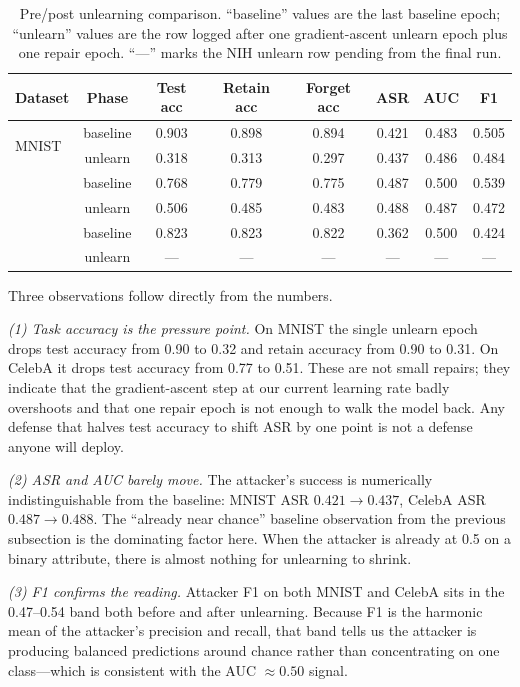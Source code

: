 \documentclass[letterpaper,twocolumn,10pt]{article}
\begin{document}
\begin{table}[t]
\centering
\small
\caption{Pre/post unlearning comparison. ``baseline'' values are the last
baseline epoch; ``unlearn'' values are the row logged after one
gradient-ascent unlearn epoch plus one repair epoch. ``---'' marks the
NIH unlearn row pending from the final run.}
\label{tab:delta}
\begin{tabular}{@{}lccccccc@{}}
\toprule
Dataset & Phase & Test acc & Retain acc & Forget acc & ASR & AUC & F1 \\
\midrule
\multirow{2}{*}{MNIST}
    & baseline & 0.903 & 0.898 & 0.894 & 0.421 & 0.483 & 0.505 \\
    & unlearn  & 0.318 & 0.313 & 0.297 & 0.437 & 0.486 & 0.484 \\
\addlinespace[2pt]
\multirow{2}{*}{CelebA}
    & baseline & 0.768 & 0.779 & 0.775 & 0.487 & 0.500 & 0.539 \\
    & unlearn  & 0.506 & 0.485 & 0.483 & 0.488 & 0.487 & 0.472 \\
\addlinespace[2pt]
\multirow{2}{*}{NIH Chest X-ray14}
    & baseline & 0.823 & 0.823 & 0.822 & 0.362 & 0.500 & 0.424 \\
    & unlearn  & ---   & ---   & ---   & ---   & ---   & ---   \\
\bottomrule
\end{tabular}
\end{table}

Three observations follow directly from the numbers.

\emph{(1) Task accuracy is the pressure point.} On MNIST the single
unlearn epoch drops test accuracy from 0.90 to 0.32 and retain accuracy
from 0.90 to 0.31. On CelebA it drops test accuracy from 0.77 to 0.51.
These are not small repairs; they indicate that the gradient-ascent step
at our current learning rate badly overshoots and that one repair epoch
is not enough to walk the model back. Any defense that halves test
accuracy to shift ASR by one point is not a defense anyone will deploy.

\emph{(2) ASR and AUC barely move.} The attacker's success is
numerically indistinguishable from the baseline: MNIST ASR
$0.421 \rightarrow 0.437$, CelebA ASR $0.487 \rightarrow 0.488$. The
``already near chance'' baseline observation from the previous subsection
is the dominating factor here. When the attacker is already at 0.5 on a
binary attribute, there is almost nothing for unlearning to shrink.

\emph{(3) F1 confirms the reading.} Attacker F1 on both MNIST and
CelebA sits in the 0.47--0.54 band both before and after unlearning.
Because F1 is the harmonic mean of the attacker's precision and recall,
that band tells us the attacker is producing balanced
predictions around chance rather than concentrating on one class---which
is consistent with the AUC $\approx 0.50$ signal.
\end{document}
